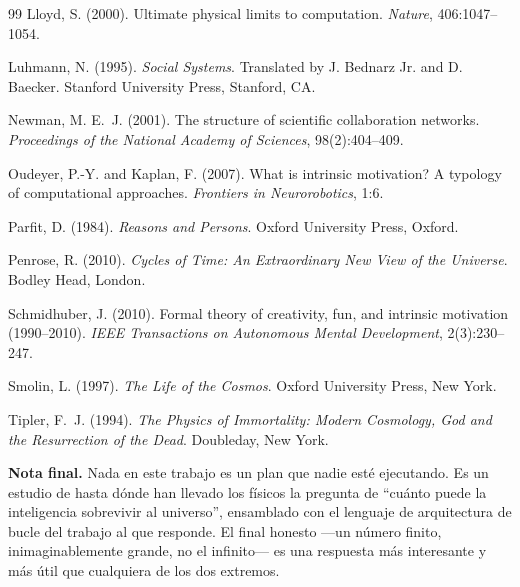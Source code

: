 \documentclass[11pt]{article}
\begin{document}
\begin{thebibliography}{99}
Lloyd, S. (2000).
\newblock Ultimate physical limits to computation.
\newblock \emph{Nature}, 406:1047--1054.

Luhmann, N. (1995).
\newblock \emph{Social Systems}.
\newblock Translated by J. Bednarz Jr. and D. Baecker. Stanford University Press, Stanford, CA.

Newman, M. E.~J. (2001).
\newblock The structure of scientific collaboration networks.
\newblock \emph{Proceedings of the National Academy of Sciences}, 98(2):404--409.

Oudeyer, P.-Y. and Kaplan, F. (2007).
\newblock What is intrinsic motivation? A typology of computational approaches.
\newblock \emph{Frontiers in Neurorobotics}, 1:6.

Parfit, D. (1984).
\newblock \emph{Reasons and Persons}.
\newblock Oxford University Press, Oxford.

Penrose, R. (2010).
\newblock \emph{Cycles of Time: An Extraordinary New View of the Universe}.
\newblock Bodley Head, London.

Schmidhuber, J. (2010).
\newblock Formal theory of creativity, fun, and intrinsic motivation (1990--2010).
\newblock \emph{IEEE Transactions on Autonomous Mental Development}, 2(3):230--247.

Smolin, L. (1997).
\newblock \emph{The Life of the Cosmos}.
\newblock Oxford University Press, New York.

Tipler, F.~J. (1994).
\newblock \emph{The Physics of Immortality: Modern Cosmology, God and the Resurrection of the Dead}.
\newblock Doubleday, New York.

\end{thebibliography}

\vspace{1cm}
\noindent\textbf{Nota final.} Nada en este trabajo es un plan que nadie esté ejecutando. Es un estudio de hasta dónde han llevado los físicos la pregunta de ``cuánto puede la inteligencia sobrevivir al universo'', ensamblado con el lenguaje de arquitectura de bucle del trabajo al que responde. El final honesto —un número finito, inimaginablemente grande, no el infinito— es una respuesta más interesante y más útil que cualquiera de los dos extremos.
\end{document}
